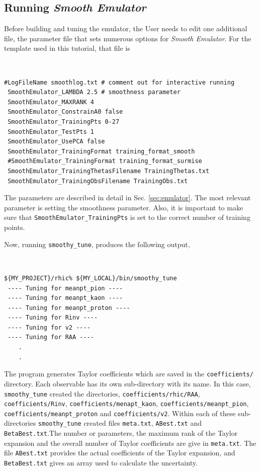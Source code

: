 \documentclass[UserManual.tex]{subfiles}
\begin{document}
\subsection{Running {\it Smooth Emulator}}
Before building and tuning the emulator, the User needs to edit one additional file, the parameter file that sets numerous options for {\it Smooth Emulator}. For the template used in this tutorial, that file is
{\tt
\begin{verbatim}
#LogFileName smoothlog.txt # comment out for interactive running
 SmoothEmulator_LAMBDA 2.5 # smoothness parameter
 SmoothEmulator_MAXRANK 4
 SmoothEmulator_ConstrainA0 false
 SmoothEmulator_TrainingPts 0-27
 SmoothEmulator_TestPts 1
 SmoothEmulator_UsePCA false
 SmoothEmulator_TrainingFormat training_format_smooth
 #SmoothEmulator_TrainingFormat training_format_surmise
 SmoothEmulator_TrainingThetasFilename TrainingThetas.txt
 SmoothEmulator_TrainingObsFilename TrainingObs.txt
\end{verbatim}
}
The parameters are described in detail in Sec. \ref{sec:emulator}. The most relevant parameter is setting the smoothness parameter. Also, it is important to make sure that {\tt SmoothEmulator\_TrainingPts} is set to the correct number of training points. 

Now, running {\tt smoothy\_tune}, produces the following output,

{\tt
\begin{verbatim}
${MY_PROJECT}/rhic% ${MY_LOCAL}/bin/smoothy_tune
 ---- Tuning for meanpt_pion ----
 ---- Tuning for meanpt_kaon ----
 ---- Tuning for meanpt_proton ----
 ---- Tuning for Rinv ----
 ---- Tuning for v2 ----
 ---- Tuning for RAA ----
    .
    .
\end{verbatim}
}


The program generates Taylor coefficients which are saved in the {\tt coefficients/} directory. Each observable has its own sub-directory with its name. In this case, {\tt smoothy\_tune} created the directories, {\tt coefficients/rhic/RAA}, {\tt coefficients/Rinv}, {\tt coefficients/menapt\_kaon}, {\tt coefficients/meanpt\_pion}, {\tt coefficients/meanpt\_proton} and {\tt coefficients/v2}. Within each of these sub-directories {\tt smoothy\_tune} created files {\tt meta.txt}, {\tt ABest.txt} and {\tt BetaBest.txt}.The number or parameters, the maximum rank of the Taylor expansion and the overall number of Taylor coefficients are give in {\tt meta.txt}. The file {\tt ABest.txt} provides the actual coefficients of the Taylor expansion, and {\tt BetaBest.txt} gives an array used to calculate the uncertainty. 
\end{document}
